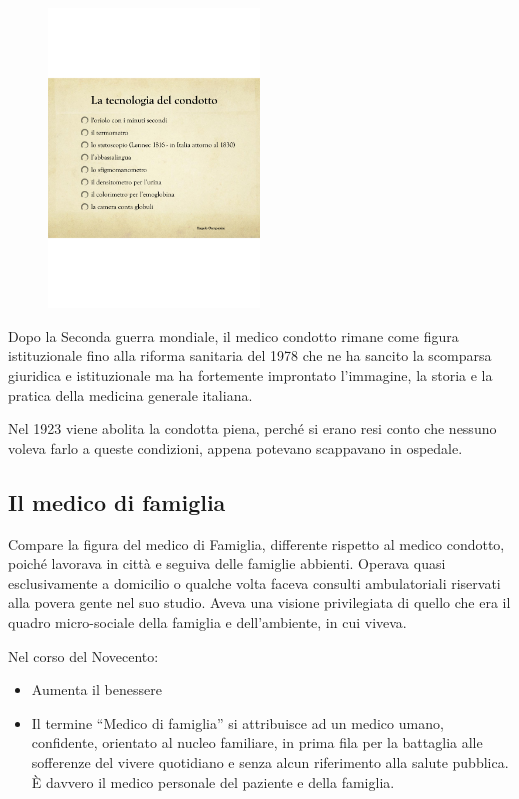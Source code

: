 \begin{figure}[!ht]
\centering
	\includegraphics[width=0.5\textwidth]{38/image3.png}
	\end{figure}
	
Dopo la Seconda guerra mondiale, il medico condotto rimane come figura
istituzionale fino alla riforma sanitaria del 1978 che ne ha sancito la
scomparsa giuridica e istituzionale ma ha fortemente improntato
l'immagine, la storia e la pratica della medicina generale italiana.

Nel 1923 viene abolita la condotta piena, perché si erano resi conto che
nessuno voleva farlo a queste condizioni, appena potevano scappavano in
ospedale.

\subsection{Il medico di famiglia}

Compare la figura del medico di Famiglia, differente rispetto al medico
condotto, poiché lavorava in città e seguiva delle famiglie abbienti.
Operava quasi esclusivamente a domicilio o qualche volta faceva consulti
ambulatoriali riservati alla povera gente nel suo studio. Aveva una
visione privilegiata di quello che era il quadro micro-sociale della
famiglia e dell'ambiente, in cui viveva.

Nel corso del Novecento:
\begin{itemize}
\item Aumenta il benessere
\item Il termine ``Medico di famiglia'' si attribuisce ad un medico umano,
confidente, orientato al nucleo familiare, in prima fila per la
battaglia alle sofferenze del vivere quotidiano e senza alcun
riferimento alla salute pubblica. È davvero il medico personale del
paziente e della famiglia.
\end{itemize}

